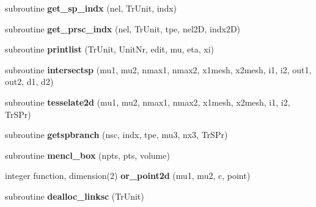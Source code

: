 \begin{DoxyCompactItemize}
\item 
\hypertarget{classtracking__routines_a449a07e6fb92ba0a8ee66c9a523da180}{subroutine {\bfseries get\+\_\+sp\+\_\+indx} (nel, Tr\+Unit, indx)}\label{classtracking__routines_a449a07e6fb92ba0a8ee66c9a523da180}

\item 
\hypertarget{classtracking__routines_a1f0cf3672641eeb44165c84dc1ae539f}{subroutine {\bfseries get\+\_\+prsc\+\_\+indx} (nel, Tr\+Unit, tpe, nel2\+D, indx2\+D)}\label{classtracking__routines_a1f0cf3672641eeb44165c84dc1ae539f}

\item 
\hypertarget{classtracking__routines_a08d1ef6f9e0330a796c7d15be2fb3ad0}{subroutine {\bfseries printlist} (Tr\+Unit, Unit\+Nr, edit, mu, eta, xi)}\label{classtracking__routines_a08d1ef6f9e0330a796c7d15be2fb3ad0}

\item 
\hypertarget{classtracking__routines_abeedf89a67b102bfdf8508ceeac45b38}{subroutine {\bfseries intersectsp} (mu1, mu2, nmax1, nmax2, x1mesh, x2mesh, i1, i2, out1, out2, d1, d2)}\label{classtracking__routines_abeedf89a67b102bfdf8508ceeac45b38}

\item 
\hypertarget{classtracking__routines_a8334bac9985b4cc57231d438f99fca01}{subroutine {\bfseries tesselate2d} (mu1, mu2, nmax1, nmax2, x1mesh, x2mesh, i1, i2, Tr\+S\+Pr)}\label{classtracking__routines_a8334bac9985b4cc57231d438f99fca01}

\item 
\hypertarget{classtracking__routines_aacdbde7e1e2aff7181d98f5c879fa805}{subroutine {\bfseries getspbranch} (nsc, indx, tpe, mu3, nx3, Tr\+S\+Pr)}\label{classtracking__routines_aacdbde7e1e2aff7181d98f5c879fa805}

\item 
\hypertarget{classtracking__routines_a1540146044b9cbf18e6da7fd82c3bfdf}{subroutine {\bfseries mencl\+\_\+box} (npts, pts, volume)}\label{classtracking__routines_a1540146044b9cbf18e6da7fd82c3bfdf}

\item 
\hypertarget{classtracking__routines_ad4d274c8431811e7f9bf2e1e91ad840e}{integer function, dimension(2) {\bfseries or\+\_\+point2d} (mu1, mu2, c, point)}\label{classtracking__routines_ad4d274c8431811e7f9bf2e1e91ad840e}

\item 
\hypertarget{classtracking__routines_aa30737dc6be18db2a4c90ae97e0b53c5}{subroutine {\bfseries dealloc\+\_\+linksc} (Tr\+Unit)}\label{classtracking__routines_aa30737dc6be18db2a4c90ae97e0b53c5}


\end{DoxyCompactItemize}
